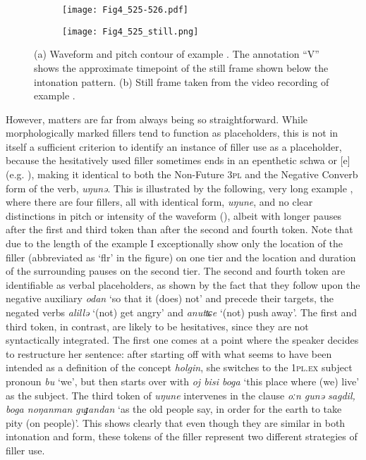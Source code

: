 \documentclass[output=paper]{langscibook}
\begin{document}
  
\begin{figure}
\centering
   \begin{subfigure}[b]{\textwidth}
   \texttt{[image: Fig4\_525-526.pdf]}
   \caption{}
   \label{fig:pakendorf:4a}
\end{subfigure}
\par\medskip
\begin{subfigure}[b]{0.75\textwidth}
\texttt{[image: Fig4\_525\_still.png]}
   \caption{}
   \label{fig:pakendorf:4b}
\end{subfigure}
\caption{(a) Waveform and pitch contour of example . The annotation “V” shows the approximate timepoint of the still frame shown below the intonation pattern. (b) Still frame taken from the video recording of example .}
\label{fig:pakendorf:4}
\end{figure}

However, matters are far from always being so straightforward. While morphologically marked fillers tend to function as placeholders, this is not in itself a sufficient criterion to identify an instance of filler use as a placeholder, because the hesitatively used filler sometimes ends in an epenthetic schwa or [e] (e.g. ), making it identical to both the Non-Future 3\textsc{pl} and the Negative Converb form of the verb, \textit{uŋunə}. This is illustrated by the following, very long example , where there are four fillers, all with identical form, \textit{uŋune}, and no clear distinctions in pitch or intensity of the waveform (), albeit with longer pauses after the first and third token than after the second and fourth token. Note that due to the length of the example I exceptionally show only the location of the filler (abbreviated as ‘flr’ in the figure) on one tier and the location and duration of the surrounding pauses on the second tier. The second and fourth token are identifiable as verbal placeholders, as shown by the fact that they follow upon the negative auxiliary \textit{odan} ‘so that it (does) not’ and precede their targets, the negated verbs \textit{alillə} ‘(not) get angry’ and \textit{anutʨe} ‘(not) push away’. The first and third token, in contrast, are likely to be hesitatives, since they are not syntactically integrated. The first one comes at a point where the speaker decides to restructure her sentence: after starting off with what seems to have been intended as a definition of the concept \textit{holgin}, she switches to the \textsc{1pl.ex} subject pronoun \textit{bu} ‘we’, but then starts over with \textit{oj bisi boga} ‘this place where (we) live’ as the subject. The third token of \textit{uŋune} intervenes in the clause \textit{oːn gunə sagdil, boga noŋanman guɟandan} ‘as the old people say, in order for the earth to take pity (on people)’. This shows clearly that even though they are similar in both intonation and form, these tokens of the filler represent two different strategies of filler use. 
\end{document}
